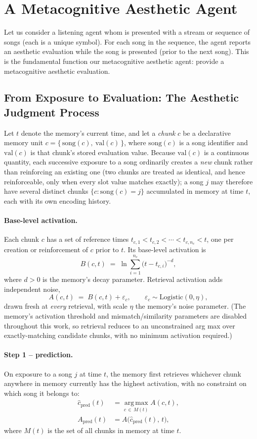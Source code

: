 \documentclass[letterpaper]{article} %
\begin{document}
\section{A Metacognitive Aesthetic Agent}
Let us consider a listening agent whom is presented with a stream or sequence of songs (each is a unique symbol).  For each song in the sequence, the agent reports an aesthetic evaluation while the song is presented (prior to the next song).  This is the fundamental function our metacognitive aesthetic agent: provide a metacognitive aesthetic evaluation.  

\subsection*{From Exposure to Evaluation: The Aesthetic Judgment Process}

Let $t$ denote the memory's current time, and let a \emph{chunk} $c$ be a
declarative memory unit $c = \{\,\mathrm{song}(c),\ \mathrm{val}(c)\,\}$, where
$\mathrm{song}(c)$ is a song identifier and $\mathrm{val}(c)$ is that chunk's
stored evaluation value. Because $\mathrm{val}(c)$ is a continuous quantity,
each successive exposure to a song ordinarily creates a \emph{new} chunk rather
than reinforcing an existing one (two chunks are treated as identical, and
hence reinforceable, only when every slot value matches exactly); a song $j$
may therefore have several distinct chunks $\{c : \mathrm{song}(c) = j\}$
accumulated in memory at time $t$, each with its own encoding history.

\paragraph{Base-level activation.}
Each chunk $c$ has a set of reference times $t_{c,1} < t_{c,2} < \cdots <
t_{c,n_c} < t$, one per creation or reinforcement of $c$ prior to $t$. Its
base-level activation is
\[
B(c,t) \;=\; \ln \sum_{i=1}^{n_c} \bigl(t - t_{c,i}\bigr)^{-d},
\]
where $d>0$ is the memory's decay parameter. Retrieval activation adds
independent noise,
\[
A(c,t) \;=\; B(c,t) + \varepsilon_c, \qquad
\varepsilon_c \sim \mathrm{Logistic}(0,\eta),
\]
drawn fresh at \emph{every} retrieval, with scale $\eta$ the memory's noise
parameter. (The memory's activation threshold and mismatch/similarity
parameters are disabled throughout this work, so retrieval reduces to an
unconstrained arg max over exactly-matching candidate chunks, with no minimum
activation required.)

\paragraph{Step 1 -- prediction.}
On exposure to a song $j$ at time $t$, the memory first retrieves whichever
chunk anywhere in memory currently has the highest activation, with no
constraint on which song it belongs to:
\begin{align*}
\hat c_{\mathrm{pred}}(t) &= \operatorname*{arg\,max}_{c \,\in\, M(t)} A(c,t), \\
A_{\mathrm{pred}}(t) &= A\bigl(\hat c_{\mathrm{pred}}(t),\, t\bigr),
\end{align*}
where $M(t)$ is the set of all chunks in memory at time $t$.
\end{document}
